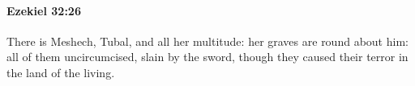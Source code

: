 
		\paragraph{Ezekiel 32:26} %
			\label{EZEKIEL-32-26}

			There is Meshech, Tubal, and all her multitude: her graves are round about him: all of them uncircumcised, slain by the sword, though they caused their terror in the land of the living.


